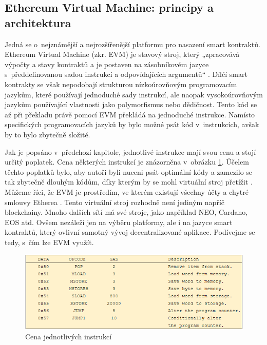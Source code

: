 \subsection*{Ethereum Virtual Machine: principy a architektura}
Jedná se o~nejznámější a nejrozšířenější platformu pro nasazení smart kontraktů. Ethereum Virtual Machine (zkr. EVM) je stavový stroj, který „zpracovává výpočty a stavy kontraktů a je postaven na zásobníkovém jazyce s~předdefinovanou sadou instrukcí a odpovídajících argumentů“ \cite{WohrerZdun}. Dílčí smart kontrakty se však nepodobají strukturou nízkoúrovňovým programovacím jazykům, které používají jednoduché sady instrukcí, ale naopak vysokoúrovňovým jazykům používající vlastnosti jako polymorfismus nebo dědičnost. Tento kód se až při překladu právě pomocí EVM překládá na jednoduché instrukce. Namísto specifických programovacích jazyků by bylo možné psát kód v~instrukcích, avšak by to bylo zbytečně složité. 

Jak je popsáno v~předchozí kapitole, jednotlivé instrukce mají svou cenu a stojí určitý poplatek. Cena některých instrukcí je znázorněna v~obrázku \ref{fig:instrukce}. Účelem těchto poplatků bylo, aby autoři byli nuceni psát optimální kódy a zamezilo se tak zbytečně dlouhým kódům, díky kterým by se mohl virtuální stroj přetížit \cite{WohrerZdun}. Můžeme říci, že EVM je prostředím, ve kterém existují všechny účty a chytré smlouvy Etherea \cite{evm}. Tento virtuální stroj rozhodně není jediným napříč blockchainy. Mnoho dalších sítí má své stroje, jako například NEO, Cardano, EOS atd. Ovšem nezáleží jen na výběru platformy, ale i na jazyce smart kontraktů, který ovlivní samotný vývoj decentralizované aplikace. Podívejme se tedy, s~čím lze EVM využít. 

\begin{figure}
\centering
\includegraphics[width=\textwidth]{obrazky/instrukce.png}
\caption{Cena jednotlivých instrukcí \cite{yellowpaper}}
\label{fig:instrukce}
\centering
\end{figure}

